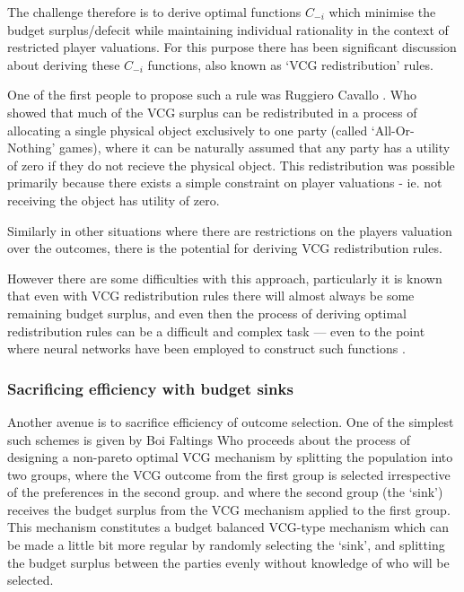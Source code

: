 The challenge therefore is to derive optimal functions $C_{-i}$ which minimise the budget surplus/defecit while maintaining individual rationality in the context of restricted player valuations.
For this purpose there has been significant discussion about deriving these $C_{-i}$ functions, also known as `VCG redistribution' rules.

One of the first people to propose such a rule was Ruggiero Cavallo \cite{Cavallo:2006:ODM:1160633.1160790}.%
Who showed that much of the VCG surplus can be redistributed in a process of allocating a single physical object exclusively to one party (called `All-Or-Nothing' games), where it can be naturally assumed that any party has a utility of zero if they do not recieve the physical object.
This redistribution was possible primarily because there exists a simple constraint on player valuations - ie. not receiving the object has utility of zero.

Similarly in other situations where there are restrictions on the players valuation over the outcomes, there is the potential for deriving VCG redistribution rules.

However there are some difficulties with this approach, particularly it is known that even with VCG redistribution rules there will almost always be some remaining budget surplus, and even then the process of deriving optimal redistribution rules can be a difficult and complex task --- even to the point where neural networks have been employed to construct such functions \cite{DBLP:conf/atal/ManishaJG18}.

\subsubsection*{Sacrificing efficiency with budget sinks}

Another avenue is to sacrifice efficiency of outcome selection.
One of the simplest such schemes is given by Boi Faltings \cite{10.1007/978-3-642-25510-6_14, 10.1007/978-3-642-25510-6_14}
Who proceeds about the process of designing a non-pareto optimal VCG mechanism by splitting the population into two groups, where the VCG outcome from the first group is selected irrespective of the preferences in the second group.
and where the second group (the `sink') receives the budget surplus from the VCG mechanism applied to the first group.
This mechanism constitutes a budget balanced VCG-type mechanism which can be made a little bit more regular by randomly selecting the `sink', and splitting the budget surplus between the parties evenly without knowledge of who will be selected.\cite{10.1007/978-3-642-25510-6_14}

